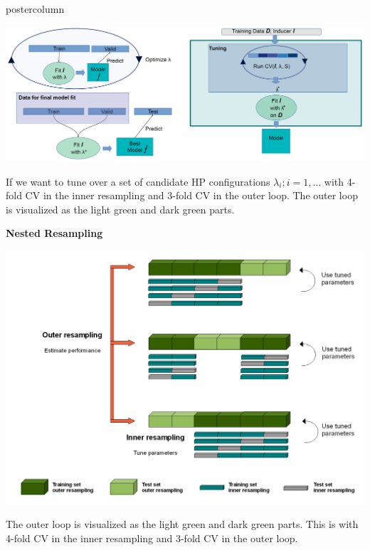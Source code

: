 \documentclass{beamer}
\begin{document}
\begin{frame}[fragile]{}
\begin{columns}
\begin{column}{.31\textwidth}
\begin{beamercolorbox}[center]{postercolumn}
\begin{minipage}{.98\textwidth}
{\begin{myblock}{}
\begin{center}
             \includegraphics[width=1\columnwidth]{img/tuning_1.PNG}
               \end{center}

\hspace*{1ex}

If we want to tune over a set of candidate HP configurations $\lambda_i; i = 1, \dots$ with 4-fold CV in the inner resampling and 3-fold CV in the outer loop. The outer loop is visualized as the light green and dark green parts.

 \begin{codebox} \textbf{Nested Resampling}	\end{codebox}
 
 \begin{center}
             \includegraphics[width=0.9\columnwidth]{img/tuning_2.PNG}
               \end{center}
The outer loop is visualized as the light green and dark green parts. This is with 4-fold CV in the inner resampling and 3-fold CV in the outer loop.

                    \end{myblock}



}
\end{minipage}
\end{beamercolorbox}
\end{column}

\end{columns}
\end{frame}
\end{document}
